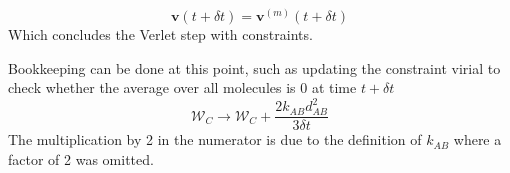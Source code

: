 \begin{equation*}
\mathbf{v}(t + \delta t) = \mathbf{v}^{(m)}(t + \delta t)
\end{equation*}
Which concludes the Verlet step with constraints.
\par Bookkeeping can be done at this point, such as updating the constraint virial to check whether the average over all molecules is $0$ at time $t + \delta t$
\begin{equation*}
	\mathcal{W}_C \rightarrow \mathcal{W}_C + \frac{2 k_{AB} d_{AB}^2}{3 \delta t }
\end{equation*}
The multiplication by 2 in the numerator is due to the definition of $k_{AB}$ where a factor of 2 was omitted.